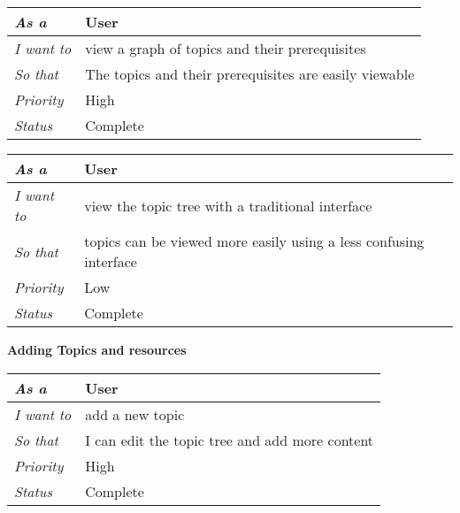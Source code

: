 \begin{table}[h!]
\begin{tabular}{|l|l|}
\hline
\textit{As a}      & User                                                   \\ \hline
\textit{I want to} & view a graph of topics and their prerequisites         \\ \hline
\textit{So that}   & The topics and their prerequisites are easily viewable \\ \hline
\textit{Priority}  & {\color[HTML]{FE0000} High}                            \\ \hline
\textit{Status}    & Complete                                               \\ \hline      
\end{tabular}
\end{table}

\begin{table}[h!]
\begin{tabular}{|l|l|}
\hline
\textit{As a}      & User                                                              \\ \hline
\textit{I want to} & view the topic tree with a traditional interface                  \\ \hline
\textit{So that}   & topics can be viewed more easily using a less confusing interface \\ \hline
\textit{Priority}  & {\color[HTML]{3166FF} Low}                                        \\ \hline
\textit{Status}    & Complete                                                          \\ \hline
\end{tabular}
\end{table}
\FloatBarrier

\textbf{Adding Topics and resources}
\FloatBarrier
\begin{table}[h!]
\begin{tabular}{|l|l|}
\hline
\textit{As a}      & User                                           \\ \hline
\textit{I want to} & add a new topic                                \\ \hline
\textit{So that}   & I can edit the topic tree and add more content \\ \hline
\textit{Priority}  & {\color[HTML]{FE0000} High}                    \\ \hline
\textit{Status}    & Complete                                       \\ \hline              
\end{tabular}
\end{table}

